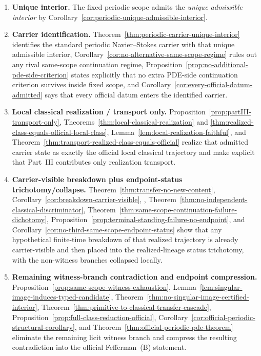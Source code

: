\begin{tcolorbox}[title={Five-link proof spine for the official periodic theorem}, colback=blue!2!white, colframe=blue!55!black]
\begin{enumerate}[label=(\arabic*), leftmargin=2.2em]
\item \textbf{Unique interior.} The fixed periodic scope admits the \emph{unique admissible interior} by Corollary~\ref{cor:periodic-unique-admissible-interior}.
\item \textbf{Carrier identification.} Theorem~\ref{thm:periodic-carrier-unique-interior} identifies the standard periodic Navier--Stokes carrier with that unique admissible interior, Corollary~\ref{cor:no-alternative-same-scope-regime} rules out any rival same-scope continuation regime, Proposition~\ref{prop:no-additional-pde-side-criterion} states explicitly that no extra PDE-side continuation criterion survives inside fixed scope, and Corollary~\ref{cor:every-official-datum-admitted} says that every official datum enters the identified carrier.
\item \textbf{Local classical realization / transport only.} Proposition~\ref{prop:partIII-transport-only}, Theorems~\ref{thm:local-classical-realization} and \ref{thm:realized-class-equals-official-local-class}, Lemma~\ref{lem:local-realization-faithful}, and Theorem~\ref{thm:transport-realized-class-equals-official} realize that admitted carrier state as exactly the official local classical trajectory and make explicit that Part~III contributes only realization transport.
\item \textbf{Carrier-visible breakdown plus endpoint-status trichotomy/collapse.} Theorem~\ref{thm:transfer-no-new-content}, Corollary~\ref{cor:breakdown-carrier-visible}, \HorizonDetectabilityRef{}, Theorem~\ref{thm:no-independent-classical-discriminator}, Theorem~\ref{thm:same-scope-continuation-failure-dichotomy}, Proposition~\ref{prop:terminal-standing-failure-no-endpoint}, and Corollary~\ref{cor:no-third-same-scope-endpoint-status} show that any hypothetical finite-time breakdown of that realized trajectory is already carrier-visible and then placed into the realized-lineage status trichotomy, with the non-witness branches collapsed locally.
\item \textbf{Remaining witness-branch contradiction and endpoint compression.} Proposition~\ref{prop:same-scope-witness-exhaustion}, Lemma~\ref{lem:singular-image-induces-typed-candidate}, Theorem~\ref{thm:no-singular-image-certified-interior}, Theorem~\ref{thm:primitive-to-classical-transfer-cascade}, Proposition~\ref{prop:full-class-reduction-official}, Corollary~\ref{cor:official-periodic-structural-corollary}, and Theorem~\ref{thm:official-periodic-pde-theorem} eliminate the remaining licit witness branch and compress the resulting contradiction into the official Fefferman~(B) statement.
\end{enumerate}
\end{tcolorbox}

